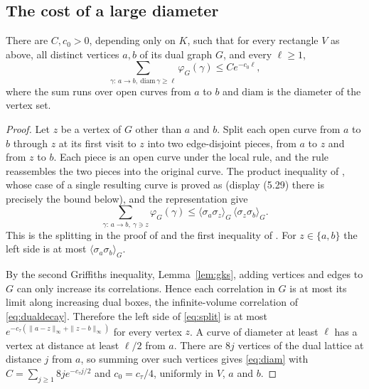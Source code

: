 \subsection{The cost of a large diameter}
\begin{lemma}\label{lem:arcs}
There are $C,c_0>0$, depending only on $K$, such that for every rectangle $V$ as above, all distinct vertices $a,b$ of its dual graph $G$, and every $\ell\ge1$,
\begin{equation}\label{eq:diam}
 \sum_{\gamma:\,a\to b,\ \mathrm{diam}\,\gamma\ge\ell}\varphi_G(\gamma)\le Ce^{-c_0\ell},
\end{equation}
where the sum runs over open curves from $a$ to $b$ and $\mathrm{diam}$ is the diameter of the vertex set.
\end{lemma}
\begin{proof}
Let $z$ be a vertex of $G$ other than $a$ and $b$. Split each open curve from $a$ to $b$ through $z$ at its first visit to $z$ into two edge-disjoint pieces, from $a$ to $z$ and from $z$ to $b$. Each piece is an open curve under the local rule, and the rule reassembles the two pieces into the original curve. The product inequality of \cite[Lemma~6.5]{PV99}, whose case of a single resulting curve is proved as \cite[Lemma~5.4]{PV97} (display (5.29) there is precisely the bound below), and the representation \cite[(6.9)]{PV99} give
\begin{equation}\label{eq:split}
 \sum_{\gamma:\,a\to b,\ \gamma\ni z}\varphi_G(\gamma)
 \le\langle\sigma_a\sigma_z\rangle_G\,\langle\sigma_z\sigma_b\rangle_G.
\end{equation}
This is the splitting in the proof of \cite[Lemma~6.7]{PV99} and the first inequality of \cite[(A.6)]{CV}. For $z\in\{a,b\}$ the left side is at most $\langle\sigma_a\sigma_b\rangle_G$.

By the second Griffiths inequality, Lemma~\ref{lem:gks}, adding vertices and edges to $G$ can only increase its correlations. Hence each correlation in $G$ is at most its limit along increasing dual boxes, the infinite-volume correlation of \eqref{eq:dualdecay}. Therefore the left side of \eqref{eq:split} is at most $e^{-c_\tau(\|a-z\|_\infty+\|z-b\|_\infty)}$ for every vertex $z$. A curve of diameter at least $\ell$ has a vertex at distance at least $\ell/2$ from $a$. There are $8j$ vertices of the dual lattice at distance $j$ from $a$, so summing over such vertices gives \eqref{eq:diam} with $C=\sum_{j\ge1}8je^{-c_\tau j/2}$ and $c_0=c_\tau/4$, uniformly in $V$, $a$ and $b$.
\end{proof}

